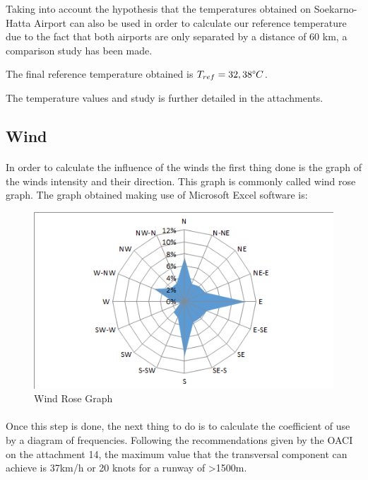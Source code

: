 		Taking into account the hypothesis that the temperatures obtained on Soekarno-Hatta Airport can also be used in order to calculate our reference temperature due to the fact that both airports are only separated by a distance of 60 km, a comparison study has been made. 
		
		The final reference temperature obtained is \(T_{ref}= 32,38\degree C\). 
		
		The temperature values and study is further detailed in the attachments.
		
		\subsection{Wind}
		\paragraph{}In order to calculate the influence of the winds the first thing done is the graph of the winds intensity and their direction. This graph is commonly called wind rose graph. The graph obtained making use of Microsoft Excel software is:
		
		\begin{figure}[H]
			\centering
			\includegraphics[clip, trim=0cm 0cm 0cm 0cm, width=1\textwidth]{./images/WIND/ROSE}
			\caption{Wind Rose Graph} %
			\label{} %
		\end{figure}
		
		\paragraph{}Once this step is done, the next thing to do is to calculate the coefficient of use by a diagram of
		frequencies. Following the recommendations given by the OACI on the attachment 14, the
		maximum value that the transversal component can achieve is 37km/h or 20 knots for a
		runway of >1500m.
		
